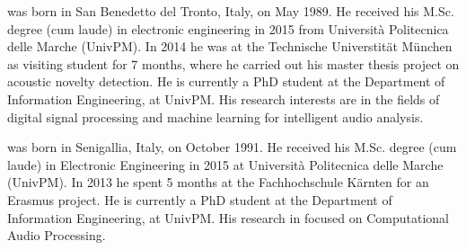 \documentclass[review]{elsarticle}
\begin{document}
 was born in San Benedetto del Tronto, Italy, on May 1989. He received his M.Sc. degree (cum laude) in electronic engineering in 2015 from Universit\`{a} Politecnica delle Marche (UnivPM). In 2014 he was at the Technische Universtit\"at M\"unchen as visiting student for 7 months, where he carried out his master thesis project on acoustic novelty detection. He is currently a PhD student at the Department of Information Engineering, at UnivPM. His research interests are in the fields of digital signal processing and machine learning for intelligent audio analysis.
\vspace{1cm}

 was born in Senigallia, Italy, on October 1991. He received his M.Sc. degree (cum laude) in Electronic Engineering in 2015 at Universit\`{a} Politecnica delle Marche (UnivPM). In 2013 he spent 5 months at the Fachhochschule K\"arnten for an Erasmus project. He is currently a PhD student at the Department of Information Engineering, at UnivPM. His research in focused on Computational Audio Processing.
\vspace{1cm}
\end{document}
